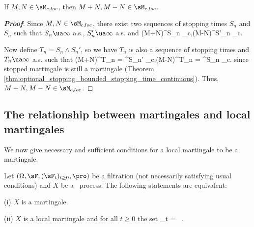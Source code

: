 \begin{proposition}\label{pro:function_of_local_martingales_is_still_local_martingale}
If $M,N\in \sM_{c,loc}$, then $M+N,M-N\in \sM_{c,loc}$.
\end{proposition}

\begin{proof}[\bf Proof]
Since $M,N\in \sM_{c,loc}$, there exist two sequences of stopping times $S_n$ and $S_n$ such that $S_n \ua \infty$ a.s., $S_n' \ua \infty$ a.s. and
\be
(M+N)^{S_n} \in \sM_c,\quad (M-N)^{S'_n} \in \sM_c.
\ee

Now define $T_n = S_n\land S_n'$, so we have $T_n$ is also a sequence of stopping times and $T_n \ua \infty$ a.s. such that
\be
(M+N)^{T_n} = ^{S_n'} \in \sM_c,\quad (M-N)^{T_n} = ^{S_n} \in \sM_c.
\ee
since stopped martingale is still a martingale (Theorem \ref{thm:optional_stopping_bounded_stopping_time_continuous}). Thus, $M+N,M-N\in \sM_{c,loc}$.
\end{proof}



\subsection{The relationship between martingales and local martingales}

We now give necessary and sufficient conditions for a local martingale to be a martingale.

\begin{proposition}\label{pro:martingale_local_martingale_equivalent}
Let $(\Omega,\sF,(\sF_t)_{t\geq 0}, \pro)$ be a filtration (not necessarily satisfying usual conditions) and $X$ be a \cadlag\ process. The following statements are equivalent:
\ben
\item [(i)] $X$ is a martingale.
\item [(ii)] $X$ is a local martingale and for all $t \geq 0$ the set
\be
\sX_t =  \ .
\ee
\een
\end{proposition}

